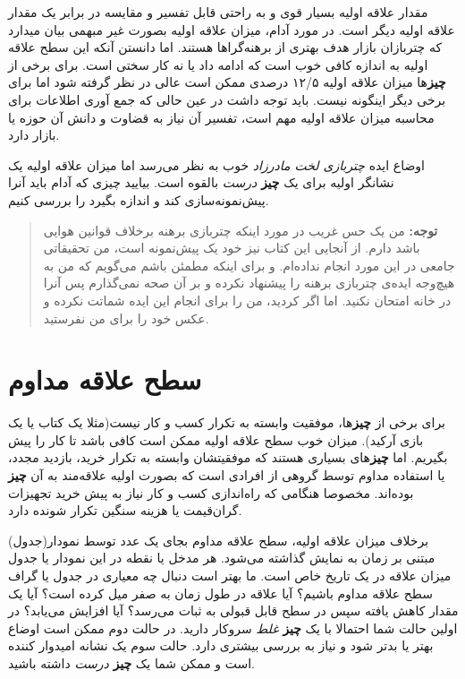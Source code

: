 مقدار علاقه اولیه بسیار قوی و به راحتی قابل تفسیر و مقایسه در برابر یک
مقدار علاقه اولیه دیگر است. در مورد آدام، میزان علاقه اولیه بصورت غیر
مبهمی بیان میدارد که چتربازان بازار هدف بهتری از برهنه‌گراها هستند. اما
دانستن آنکه این سطح علاقه اولیه به اندازه کافی خوب است که ادامه داد یا
نه کار سختی است. برای برخی از \textbf{چیز}ها میزان علاقه اولیه ۱۲/۵
درصدی ممکن است عالی در نظر گرفته شود اما برای برخی دیگر اینگونه نیست.
باید توجه داشت در عین حالی که جمع آوری اطلاعات برای محاسبه میزان علاقه
اولیه مهم است، تفسیر آن نیاز به قضاوت و دانش آن حوزه یا بازار دارد.

اوضاع ایده \emph{چتربازی لخت مادرزاد} خوب به نظر می‌رسد اما میزان علاقه
اولیه یک نشانگر اولیه برای یک \textbf{چیز} \emph{درست} بالقوه است.
بیایید چیزی که آدام باید آنرا پیش‌نمونه‌سازی کند و اندازه بگیرد را بررسی
کنیم.

\begin{quote}
\textbf{توجه:} من یک حس غریب در مورد اینکه چتربازی برهنه برخلاف قوانین
هوایی باشد دارم. از آنجایی این کتاب نیز خود یک پیش‌نمونه است، من
تحقیقاتی جامعی در این مورد انجام نداده‌ام. و برای اینکه مطمئن باشم
می‌گویم که من به هیچ‌وجه ایده‌ی چتربازی برهنه را پیشنهاد نکرده و بر آن
صحه نمی‌گذارم پس آنرا در خانه امتحان نکنید. اما اگر کردید، من را برای
انجام این ایده شماتت نکرده و عکس خود را برای من نفرستید.
\end{quote}

\section{سطح علاقه
مداوم}\label{ux633ux637ux62d-ux639ux644ux627ux642ux647-ux645ux62fux627ux648ux645}

برای برخی از \textbf{چیز}ها، موفقیت وابسته به تکرار کسب و کار نیست(مثلا
یک کتاب یا یک بازی آرکید). میزان خوب سطح علاقه اولیه ممکن است کافی باشد
تا کار را پیش بگیریم. اما \textbf{چیز}های بسیاری هستند که موفقیتشان
وابسته به تکرار خرید، بازدید مجدد، یا استفاده مداوم توسط گروهی از افرادی
است که بصورت اولیه علاقه‌مند به آن \textbf{چیز} بوده‌اند. مخصوصا هنگامی
که راه‌اندازی کسب و کار نیاز به پیش خرید تجهیزات گران‌قیمت یا هزینه
سنگین تکرار شونده دارد.

برخلاف میزان علاقه اولیه، سطح علاقه مداوم بجای یک عدد توسط نمودار(جدول)
مبتنی بر زمان به نمایش گذاشته می‌شود. هر مدخل یا نقطه در این نمودار یا
جدول میزان علاقه در یک تاریخ خاص است. ما بهتر است دنبال چه معیاری در
جدول یا گراف سطح علاقه مداوم باشیم؟ آیا علاقه در طول زمان به صفر میل
کرده است؟ آیا یک مقدار کاهش یافته سپس در سطح قابل قبولی به ثبات می‌رسد؟
آیا افزایش می‌یابد؟ در اولین حالت شما احتمالا با یک \textbf{چیز}
\emph{غلط} سروکار دارید. در حالت دوم ممکن است اوضاع بهتر یا بدتر شود و
نیاز به بررسی بیشتری دارد. حالت سوم یک نشانه امیدوار کننده است و ممکن
شما یک \textbf{چیز} \emph{درست} داشته باشید.

